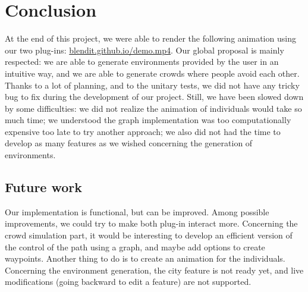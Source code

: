 \section{Conclusion}

At the end of this project, we were able to render the following animation using our two plug-ins: \url{blendit.github.io/demo.mp4}. Our global proposal is mainly respected: we are able to generate environments provided by the user in an intuitive way, and we are able to generate crowds where people avoid each other. Thanks to a lot of planning, and to the unitary tests, we did not have any tricky bug to fix during the development of our project. Still, we have been slowed down by some difficulties: we did not realize the animation of individuals would take so much time;  we understood the graph implementation was too computationally expensive too late to try another approach; we also did not had the time to develop as many features as we wished concerning the generation of environments. 

\subsection{Future work}

Our implementation is functional, but can be improved. Among possible improvements, we could try to make both plug-in interact more. Concerning the crowd simulation part, it would be interesting to develop an efficient version of the control of the path using a graph, and maybe add options to create waypoints. Another thing to do is to create an animation for the individuals. Concerning the environment generation, the city feature is not ready yet, and live modifications (going backward to edit a feature) are not supported.


